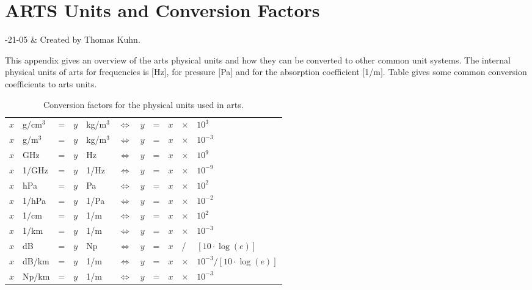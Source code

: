 \chapter{ARTS Units and Conversion Factors}


-21-05 & Created by Thomas Kuhn. \\
\stophistory

 This appendix gives an overview of the arts physical units 
 and how they can be converted to other common unit systems.
 The internal physical units of arts for frequencies is $[$Hz$]$,
 for pressure $[$Pa$]$ and for the absorption coefficient $[$1/m$]$.
 Table  gives some common conversion
 coefficients to arts units.

\begin{table}[!thb]
  \begin{center}
  \begin{tabular}{lllllllllll}
   \hline
   $x$ & g/cm$^3$ & = & $y$ & kg/m$^3$ & $\Leftrightarrow$ & $y$ & = &
   $x$ & $\times$ & $10^{3}$ \\
   $x$ & g/m$^3$  & = & $y$ & kg/m$^3$ & $\Leftrightarrow$ & $y$ & = & $x$ & $\times$ & $10^{-3}$ \\
   $x$ & GHz      & = & $y$ & Hz       & $\Leftrightarrow$ & $y$ & = & $x$ & $\times$ & $ 10^{9}$ \\
   $x$ & 1/GHz    & = & $y$ & 1/Hz     & $\Leftrightarrow$ & $y$ & = & $x$ & $\times$ & $10^{-9}$ \\
   $x$ & hPa      & = & $y$ & Pa       & $\Leftrightarrow$ & $y$ & = & $x$ & $\times$ & $10^{2}$ \\
   $x$ & 1/hPa    & = & $y$ & 1/Pa     & $\Leftrightarrow$ & $y$ & = & $x$ & $\times$ & $10^{-2}$ \\
   $x$ & 1/cm     & = & $y$ & 1/m      & $\Leftrightarrow$ & $y$ & = & $x$ & $\times$ & $10^{2}$ \\
   $x$ & 1/km     & = & $y$ & 1/m      & $\Leftrightarrow$ & $y$ & = & $x$ & $\times$ & $10^{-3}$ \\
   $x$ & dB       & = & $y$ & Np       & $\Leftrightarrow$ & $y$ & = & $x$ & / & $[10\cdot\log{(e)}]$ \\
   $x$ & dB/km    & = & $y$ & 1/m      & $\Leftrightarrow$ & $y$ & = &
   $x$ & $\times$ & $10^{-3} / [10\cdot\log{(e)}]$ \\
   $x$ & Np/km    & = & $y$ & 1/m      & $\Leftrightarrow$ & $y$ & = & $x$ & $\times$ & $10^{-3}$ \\
   \hline
 \end{tabular}
 \end{center}
 \caption{Conversion factors for the physical units used in arts.}
\end{table}

